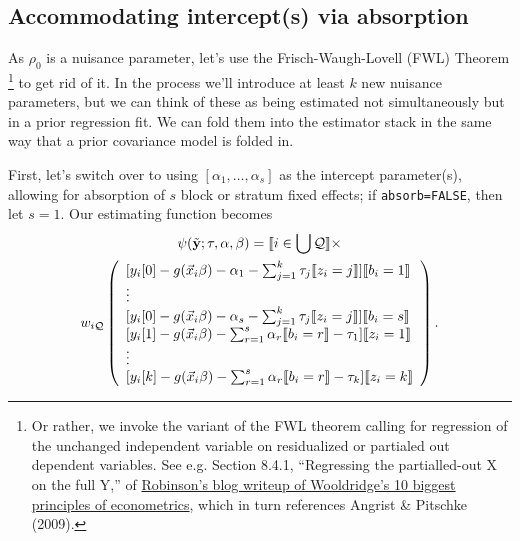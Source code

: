 \documentclass{article}
\DeclarePairedDelimiter{\indicator}{\llbracket}{\rrbracket}
\begin{document}
\subsection{Accommodating intercept(s) via absorption}\label{sec:accomm-interc-via}
As $\rho_{0}$ is a nuisance parameter, let's use the
Frisch-Waugh-Lovell (FWL) Theorem%
\footnote{Or rather, we invoke the variant of the FWL theorem calling
  for regression of the unchanged independent variable on residualized
or partialed out dependent variables.  See e.g. Section 8.4.1,
``Regressing the partialled-out X on the full Y,'' of
\href{https://bookdown.org/ts_robinson1994/10_fundamental_theorems_for_econometrics/frisch.html}{Robinson's
  blog writeup of Wooldridge's 10 biggest principles of econometrics},
which in turn references Angrist \& Pitschke (2009).} to get rid of it.  In the process we'll
introduce at least $k$ new nuisance parameters, but we can think of these as
being estimated not simultaneously but in a prior regression fit.
We can fold them into the estimator stack in the same way that a prior
covariance model is folded in.

First, let's switch over to using $[\alpha_{1}, \ldots, \alpha_{s}]$
as the intercept parameter(s), allowing for absorption of $s$ block or
stratum fixed effects; if \texttt{absorb=FALSE}, then let $s=1$.    Our estimating function becomes
\begin{multline}
  \label{eq:9}
  \psi(\tilde{\mathbf{y}}; \tau, \alpha, \beta) =
  \indicator{i \in \bigcup \mathcal{Q}} \times \\
  w_{i\mathcal{Q}}
  \left(
    \begin{array}{l}
           [y_{i}[0] - g(\vec{x}_{i}\beta)-
                  \alpha_{1} -
      \sum_{j=1}^{k}\tau_{j}\indicator{z_{i}=j}]\indicator{b_{i}=1}\\
      \vdots\\ 
          {} [y_{i}[0] - g(\vec{x}_{i}\beta)-
                  \alpha_{s} -
      \sum_{j=1}^{k}\tau_{j}\indicator{z_{i}=j}]\indicator{b_{i}=s}\\      
         {}  [y_{i}[1] - g(\vec{x}_{i}\beta)-
                  \sum_{r=1}^s\alpha_r\indicator{b_i=r}-\tau_{1}]\indicator{z_{i}=1}\\
                  \vdots \\
          {} [y_{i}[k] - g(\vec{x}_{i}\beta)-
                 \sum_{r=1}^s\alpha_r\indicator{b_i=r} - \tau_{k}]\indicator{z_{i}=k}\\
    \end{array}
\right).
\end{multline}
\end{document}
